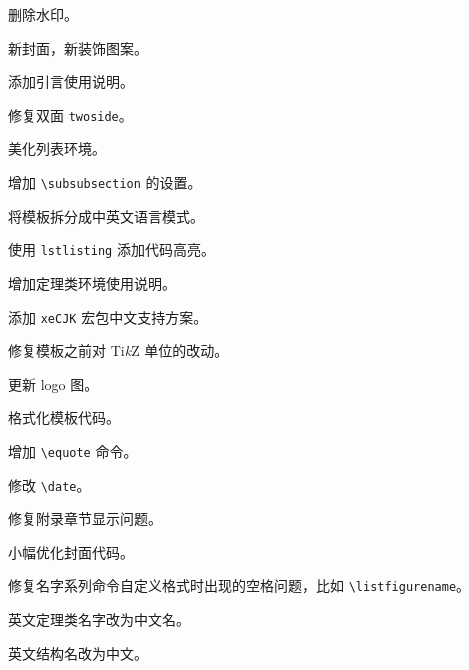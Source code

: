 \documentclass[cn,10pt,math=newtx,citestyle=gb7714-2015,bibstyle=gb7714-2015]{elegantbook}
\begin{document}

\begin{change}
  \item 删除水印。
  \item 新封面，新装饰图案。
  \item 添加引言使用说明。
  \item 修复双面 \lstinline{twoside}。
  \item 美化列表环境。
  \item 增加 \lstinline{\subsubsection} 的设置。
  \item 将模板拆分成中英文语言模式。
  \item 使用 \lstinline{lstlisting} 添加代码高亮。
  \item 增加定理类环境使用说明。
\end{change}


\begin{change}
  \item 添加 \lstinline{xeCJK} 宏包中文支持方案。
  \item 修复模板之前对 Ti\textit{k}Z 单位的改动。
  \item 更新 logo 图。
\end{change}


\begin{change}
  \item 格式化模板代码。
  \item 增加 \lstinline{\equote} 命令。
  \item 修改 \lstinline{\date}。
\end{change}


\begin{change}
  \item 修复附录章节显示问题。
  \item 小幅优化封面代码。
\end{change}


\begin{change}
  \item 修复名字系列命令自定义格式时出现的空格问题，比如 \lstinline{\listfigurename}。
  \item 英文定理类名字改为中文名。
  \item 英文结构名改为中文。
\end{change}
\end{document}

